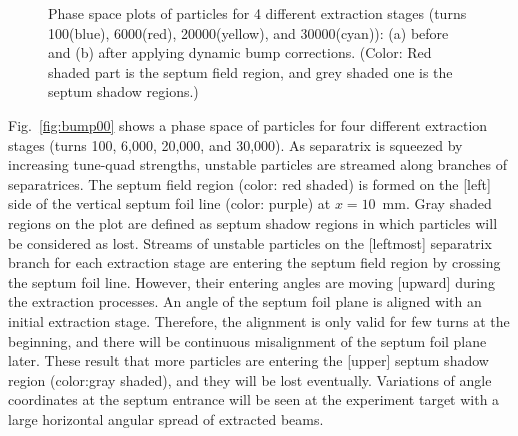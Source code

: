 \documentclass[aps,prstab,onecolumn,preprint,endfloats,11pt]{revtex4-1}
\begin{document}
\begin{figure}[!tbp]
  \caption{\label{fig:bump0}Phase space plots of particles for 4 different extraction stages (turns 100(blue), 6000(red), 20000(yellow), and 30000(cyan)): (a) before and (b) after applying dynamic bump corrections. (Color: Red shaded part is the septum field region, and grey shaded one is the septum shadow regions.)}
\end{figure}

Fig.~\ref{fig:bump00} shows a phase space of particles for four different extraction stages (turns 100, 6,000, 20,000, and 30,000).
As separatrix is squeezed by increasing tune-quad strengths, unstable particles are streamed along branches of separatrices. 
The septum field region (color: red shaded) is formed on the [left] side of the vertical septum foil line (color: purple) at $x=10$~mm. 
Gray shaded regions on the plot are defined as septum shadow regions in which particles will be considered as lost.
Streams of unstable particles on the [leftmost] separatrix branch for each extraction stage are entering the septum field region by crossing the septum foil line.
However, their entering angles are moving [upward] during the extraction processes.
An angle of the septum foil plane is aligned with an initial extraction stage.
Therefore, the alignment is only valid for few turns at the beginning, and there will be continuous misalignment of the septum foil plane later.
These result that more particles are entering the [upper] septum shadow region (color:gray shaded), and they will be lost eventually.
Variations of angle coordinates at the septum entrance will be seen at the experiment target with a large horizontal angular spread of extracted beams.
\end{document}
